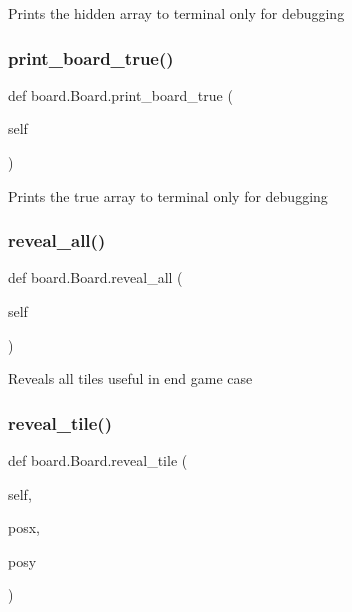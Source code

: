 \begin{DoxyVerb}Prints the hidden array to terminal
    only for debugging\end{DoxyVerb}
 \mbox{\label{classboard_1_1_board_a71c3995ac93cb4f40abdb1c684b6cafd}} 
\subsubsection{\texorpdfstring{print\+\_\+board\+\_\+true()}{print\_board\_true()}}
{\footnotesize\ttfamily def board.\+Board.\+print\+\_\+board\+\_\+true (\begin{DoxyParamCaption}\item[{}]{self }\end{DoxyParamCaption})}

\begin{DoxyVerb}Prints the true array to terminal
only for debugging\end{DoxyVerb}
 \mbox{\label{classboard_1_1_board_ad69981d86037be2ba3c5b8d5586d3c8e}} 
\subsubsection{\texorpdfstring{reveal\+\_\+all()}{reveal\_all()}}
{\footnotesize\ttfamily def board.\+Board.\+reveal\+\_\+all (\begin{DoxyParamCaption}\item[{}]{self }\end{DoxyParamCaption})}

\begin{DoxyVerb}Reveals all tiles
    useful in end game case\end{DoxyVerb}
 \mbox{\label{classboard_1_1_board_a2d186854c045a32d53a302e5d73d480e}} 
\subsubsection{\texorpdfstring{reveal\+\_\+tile()}{reveal\_tile()}}
{\footnotesize\ttfamily def board.\+Board.\+reveal\+\_\+tile (\begin{DoxyParamCaption}\item[{}]{self,  }\item[{}]{posx,  }\item[{}]{posy }\end{DoxyParamCaption})}

